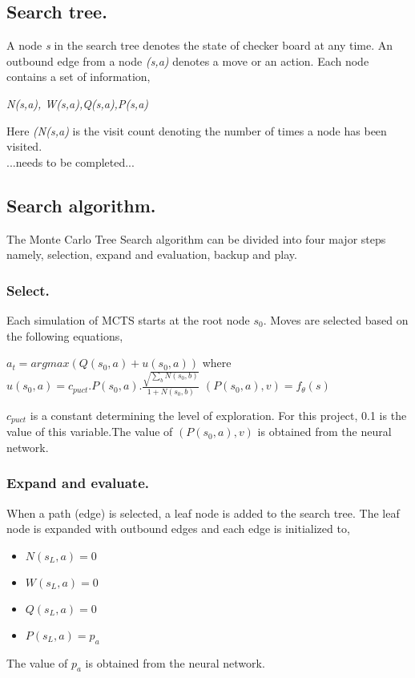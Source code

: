 \documentclass[letterpaper]{article}
\begin{document}
\subsection{Search tree.} A node \textit{s} in the search tree denotes the state of checker board  at any time. An outbound edge from a node \textit{(s,a)} denotes a move or an action. Each node contains a set of information,\\
\begin{center}
    \textit{{N(s,a), W(s,a),Q(s,a),P(s,a)}}
\end{center}
Here \textit{(N(s,a)} is the visit count denoting the number of times a node has been visited.\\
...needs to be completed...
\subsection{Search algorithm.} The Monte Carlo Tree Search algorithm can be divided into four major steps namely, selection, expand and evaluation, backup and play.
\subsubsection{Select.} Each simulation of MCTS starts at the root node \textit{$s_0$}. Moves are selected based on the following equations,
\begin{center}
        $a_t = argmax(Q(s_0,a)+u(s_0,a))$
        \newline
        \newline
        where $u(s_0,a) = c_{puct}.P(s_0,a).\frac{\sqrt{\sum_{b}N(s_0,b)}}{1+N(s_0,b)}$
        \newline
        \newline
        $(P(s_0,a),v) = f_{\theta}(s)$
\end{center}
$c_{puct}$ is a constant determining the level of exploration. For this project, 0.1 is the value of this variable.The value of $(P(s_0,a),v)$ is obtained from the neural network.
\subsubsection{Expand and evaluate.} When a path (edge) is selected, a leaf node is added to the search tree. The leaf node is expanded with outbound edges and each edge is initialized to,
\begin{itemize}
    \item $N(s_L,a)=0$
    \item $W(s_L,a)=0$
    \item $Q(s_L,a)=0$
    \item $P(s_L,a)=p_a$
\end{itemize}
The value of $p_a$ is obtained from the neural network.
\end{document}

